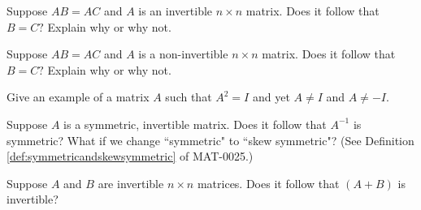 \documentclass{ximera}
\begin{document}
\begin{problem}\label{prob:cancelprop}
Suppose $AB=AC$ and $A$ is an invertible $n\times n$ matrix. Does it
follow that $B=C?$ Explain why or why not.
\end{problem}

\begin{problem}\label{prob:cancelpropsingular}
Suppose $AB=AC$ and $A$ is a non-invertible $n\times n$ matrix. Does it
follow that $B=C?$ Explain why or why not.
\end{problem}


\begin{problem}\label{prob:Asquaredid}
Give an example of a matrix $A$ such that $A^{2}=I$ and yet $A\neq I$
and $A\neq -I.$
\end{problem}

\begin{problem}\label{prob:invofsymm}
Suppose $A$ is a symmetric, invertible matrix.  Does it follow that $A^{-1}$ is symmetric?  What if we change ``symmetric" to ``skew symmetric"?  (See Definition \ref{def:symmetricandskewsymmetric} of MAT-0025.)
\end{problem}

\begin{problem}\label{prob:sumofinvertible} Suppose $A$ and $B$ are invertible $n\times n$ matrices.  Does it follow that $(A+B)$ is invertible?
\end{problem}
\end{document}

